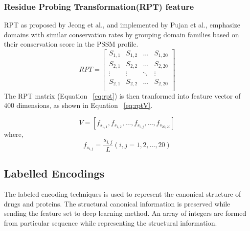   \subsubsection{Residue Probing Transformation(RPT) feature}
  RPT as proposed by Jeong et al.\cite{Jeong2011}, and implemented by Pujan et al.\cite{Mishra2019}, emphasize domains with similar conservation rates by grouping domain families based on their conservation score in the PSSM profile.
  \begin{equation}
    RPT = \begin{bmatrix}
      S_{1,1} & S_{1,2} & \dots & S_{1,20} \\
      S_{2,1} & S_{2,2} & \dots & S_{2,20} \\
      \vdots  & \vdots  & \ddots & \vdots \\
      S_{2,1} & S_{2,2} & \dots & S_{2,20} \\
    \end{bmatrix}
    \label{eq:rpt}
  \end{equation}
  The RPT matrix (Equation ~\ref{eq:rpt}) is then tranformed into feature vector of 400 dimensions, as shown in Equation ~\ref{eq:rptV}.
  
  \begin{equation}
    V = [ f_{s_{1,1}}, f_{s_{1,2}}, \dots, f_{s_{i,j}}, \dots, f_{s_{20,20}} ]
    \label{eq:rptV}
  \end{equation}
  where, 
  \begin{equation}
    f_{s_{i,j}} = \frac{s_{i,j}}{L} (i,j = 1,2,\dots,20)
    \label{eq:rptF}
  \end{equation}

  \subsection{Labelled Encodings}
  
  The labeled encoding techniques is used to represent the canonical structure of drugs and proteins. The structural canonical information is preserved while sending the feature set to deep learning method. An array of integers are formed from particular sequence while representing the structural information.
  
